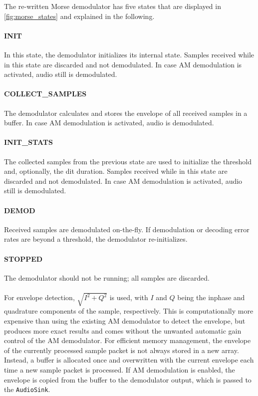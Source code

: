 The re-written Morse demodulator has five states that are displayed in \autoref{fig:morse_states} and explained in the following.

\paragraph{INIT} In this state, the demodulator initializes its internal state. Samples received while in this state are discarded and not demodulated. In case \ac{AM} demodulation is activated, audio still is demodulated.
\paragraph{COLLECT\_{}SAMPLES} The demodulator calculates and stores the envelope of all received samples in a buffer. In case \ac{AM} demodulation is activated, audio is demodulated.
\paragraph{INIT\_{}STATS} The collected samples from the previous state are used to initialize the threshold and, optionally, the dit duration. Samples received while in this state are discarded and not demodulated. In case \ac{AM} demodulation is activated, audio still is demodulated.
\paragraph{DEMOD} Received samples are demodulated on-the-fly. If demodulation or decoding error rates are beyond a threshold, the demodulator re-initializes.
\paragraph{STOPPED} The demodulator should not be running; all samples are discarded.
\paragraph{}

For envelope detection, $\sqrt{I^{2}+Q^{2}}$ is used, with $I$ and $Q$ being the inphase and quadrature components of the sample, respectively. This is computationally more expensive than using the existing \ac{AM} demodulator to detect the envelope, but produces more exact results and comes without the unwanted automatic gain control of the \ac{AM} demodulator. For efficient memory management, the envelope of the currently processed sample packet is not always stored in a new array. Instead, a buffer is allocated once and overwritten with the current envelope each time a new sample packet is processed. If \ac{AM} demodulation is enabled, the envelope is copied from the buffer to the demodulator output, which is passed to the \texttt{AudioSink}.

